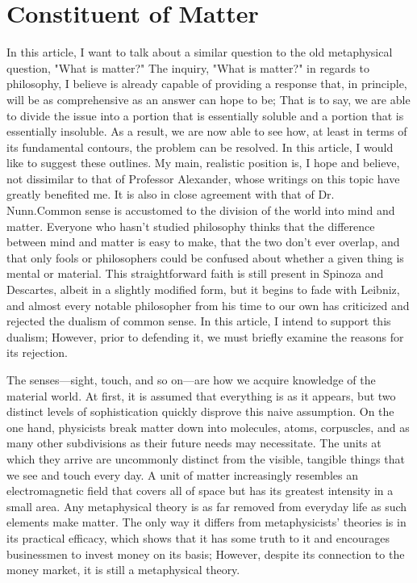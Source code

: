 \documentclass[a4paper,12pt]{book}[2004/02/16]
\theoremstyle{ilemma}
\theoremstyle{itheorem}
\theoremstyle{iother}
\theoremstyle{icorollary}
\theoremstyle{numcorollary}
\theoremstyle{idefinition}
\begin{document}
\chapter{Constituent of Matter}
In this article, I want to talk about a similar question to the old metaphysical question, "What is matter?" The inquiry, "What is matter?"
in regards to philosophy, I believe is already capable of providing a response that, in principle, will be as comprehensive as an answer can hope to be; That is to say, we are able to divide the issue into a portion that is essentially soluble and a portion that is essentially insoluble. As a result, we are now able to see how, at least in terms of its fundamental contours, the problem can be resolved. In this article, I would like to suggest these outlines. My main, realistic position is, I hope and believe, not dissimilar to that of Professor Alexander, whose writings on this topic have greatly benefited me. It is also in close agreement with that of Dr. Nunn.Common sense is accustomed to the division of the world into mind and matter. Everyone who hasn't studied philosophy thinks that the difference between mind and matter is easy to make, that the two don't ever overlap, and that only fools or philosophers could be confused about whether a given thing is mental or material. This straightforward faith is still present in Spinoza and Descartes, albeit in a slightly modified form, but it begins to fade with Leibniz, and almost every notable philosopher from his time to our own has criticized and rejected the dualism of common sense. In this article, I intend to support this dualism; However, prior to defending it, we must briefly examine the reasons for its rejection.

The senses—sight, touch, and so on—are how we acquire knowledge of the material world. At first, it is assumed that everything is as it appears, but two distinct levels of sophistication quickly disprove this naive assumption. On the one hand, physicists break matter down into molecules, atoms, corpuscles, and as many other subdivisions as their future needs may necessitate. The units at which they arrive are uncommonly distinct from the visible, tangible things that we see and touch every day. A unit of matter increasingly resembles an electromagnetic field that covers all of space but has its greatest intensity in a small area. Any metaphysical theory is as far removed from everyday life as such elements make matter. The only way it differs from metaphysicists' theories is in its practical efficacy, which shows that it has some truth to it and encourages businessmen to invest money on its basis; However, despite its connection to the money market, it is still a metaphysical theory.
\end{document}

